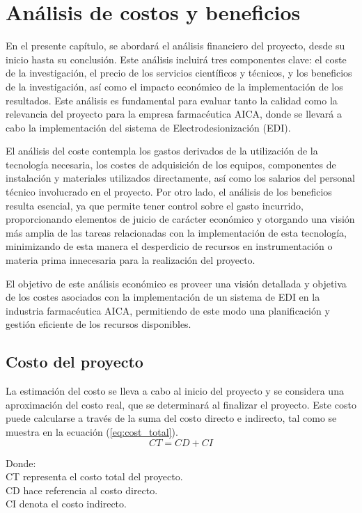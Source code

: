 \chapter{Análisis de costos y beneficios}
En el presente capítulo, se abordará el análisis financiero del proyecto, desde su inicio hasta su conclusión.
Este análisis incluirá tres componentes clave: el coste de la investigación, el precio de los servicios
científicos y técnicos, y los beneficios de la investigación, así como el impacto económico de la
implementación de los resultados. Este análisis es fundamental para evaluar tanto la calidad como la
relevancia del proyecto para la empresa farmacéutica AICA, donde se llevará a cabo la implementación
del sistema de Electrodesionización (EDI).

El análisis del coste contempla los gastos derivados de la utilización de la tecnología necesaria,
los costes de adquisición de los equipos, componentes de instalación y materiales utilizados directamente,
así como los salarios del personal técnico involucrado en el proyecto. Por otro lado, el análisis de los
beneficios resulta esencial, ya que permite tener control sobre el gasto incurrido, proporcionando elementos
de juicio de carácter económico y otorgando una visión más amplia de las tareas relacionadas con la
implementación de esta tecnología, minimizando de esta manera el desperdicio de recursos en instrumentación
o materia prima innecesaria para la realización del proyecto.

El objetivo de este análisis económico es proveer una visión detallada y objetiva de los costes asociados con
la implementación de un sistema de EDI en la industria farmacéutica AICA, permitiendo de este modo una
planificación y gestión eficiente de los recursos disponibles.


\section{Costo del proyecto}

La estimación del costo se lleva a cabo al inicio del proyecto y se considera una aproximación del costo
real, que se determinará al finalizar el proyecto. Este costo puede calcularse a través de la suma del
costo directo e indirecto, tal como se muestra en la ecuación (\ref{eq:cost_total}).
\begin{equation}
    \label{eq:cost_total}
    CT = CD + CI
\end{equation}

Donde: \\
CT representa el costo total del proyecto. \\
CD hace referencia al costo directo. \\
CI denota el costo indirecto.

